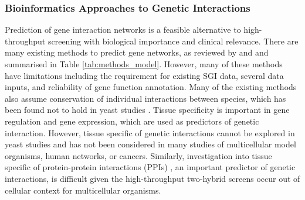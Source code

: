 \subsubsection{Bioinformatics Approaches to Genetic Interactions}

Prediction of gene interaction networks is a feasible alternative to high-throughput screening with biological importance and clinical relevance. There are many existing methods to predict gene networks, as reviewed by \citet{vanSteen2011} and \citet{Boucher2013} and summarised in Table \ref{tab:methods_model}. However, many of these methods have limitations including the requirement for existing SGI data, several data inputs, and reliability of gene function annotation. Many of the existing methods also assume conservation of individual interactions between species, which has been found not to hold in yeast studies \citep{Dixon2008}. Tissue specificity is important in gene regulation and gene expression, which are used as predictors of genetic interaction. However, tissue specific of genetic interactions cannot be explored in yeast studies and has not been considered in many studies of multicellular model organisms, human networks, or cancers. Similarly, investigation into tissue specific of protein-protein interactions (PPIs) , an important predictor of genetic interactions, is difficult given the high-throughput two-hybrid screens occur out of cellular context for multicellular organisms.  

